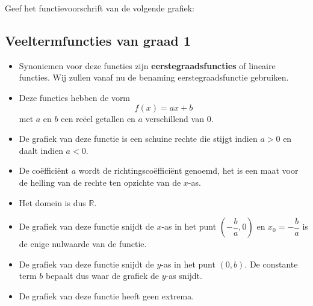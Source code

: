 \documentclass[12pt]{article}
\begin{document}
\begin{oefening}
  Geef het functievoorschrift van de volgende grafiek:
  \begin{center}
  \end{center}
\end{oefening}

\pagebreak
\subsection{Veeltermfuncties van graad 1}

\begin{itemize}
\item Synoniemen voor deze functies zijn {\bf eerstegraadsfuncties} of lineaire functies. Wij zullen vanaf nu de benaming eerstegraadsfunctie gebruiken.
\item Deze functies hebben de vorm
  $$f(x) = ax+b $$
  met $a$ en $b$ een reëel getallen en $a$ verschillend van $0$.
\item De grafiek van deze functie is een schuine rechte die stijgt indien $a > 0$ en daalt indien $a<0$.
\item De coëfficiënt $a$ wordt de richtingscoëfficiënt genoemd, het is een maat voor de helling van de rechte ten opzichte van de $x$-as.
\item Het domein is dus $\mathbb{R}$.
\item De grafiek van deze functie snijdt de $x$-as in het punt $(-\dfrac{b}{a}, 0)$ en $x_0=-\dfrac{b}{a}$ is de enige nulwaarde van de functie.
\item De grafiek van deze functie snijdt de $y$-as in het punt $(0, b)$. De constante term $b$ bepaalt dus waar de grafiek de $y$-as snijdt.
\item De grafiek van deze functie heeft geen extrema.
\end{itemize}
\end{document}
